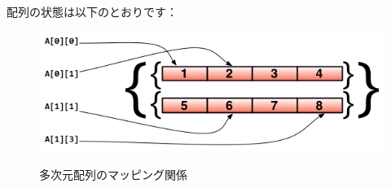 配列の状態は以下のとおりです：

\begin{figure}[H]
  \includegraphics[width=14cm]{2.2.array.png}
   \label{図2.2}
   \caption{多次元配列のマッピング関係}
\end{figure}

